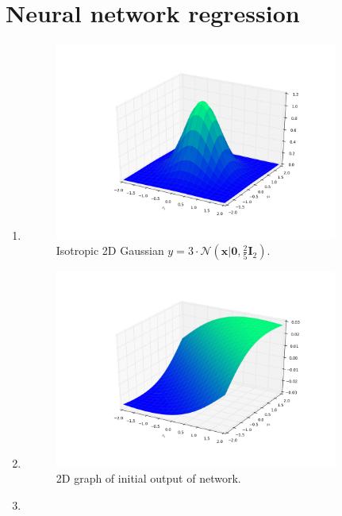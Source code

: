 \documentclass[a4paper,10pt]{article}
\numberwithin{equation}{section} %
\numberwithin{figure}{section} %
\numberwithin{table}{section} %
\theoremstyle{mytheor}
\begin{document}
\section{Neural network regression}
\begin{enumerate}
	\item \begin{figure}[h]
   			\centering
   			\includegraphics[width=0.88\textwidth]{std_iso_gaussian.png}\vspace{-1cm}
   			\caption{\vspace{-0.1cm} Isotropic 2D Gaussian $y = 3 \cdot \mathcal{N}(\boldsymbol{x} \big\vert \boldsymbol{0}, \frac{2}{5} \boldsymbol{I}_2)$.}\vspace{-0.2cm}
  		\end{figure}
	\item \begin{figure}[h]
   			\centering
   			\includegraphics[width=0.88\textwidth]{ex2_2.png}\vspace{-1cm}
   			\caption{\vspace{-0.1cm} 2D graph of initial output of network.}\vspace{-0.2cm}
  		\end{figure}
	\item 
\end{enumerate}
\end{document}
